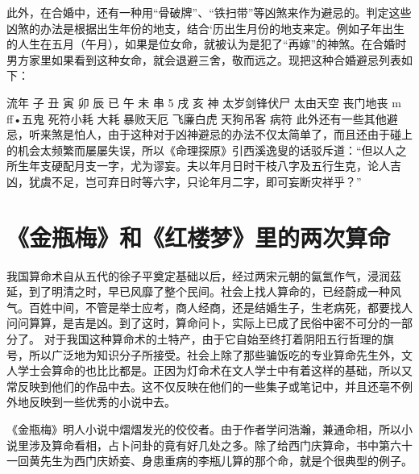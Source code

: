此外，在合婚中，还有一种用“骨破牌”、“铁扫带”等凶煞来作为避忌的。判定这些凶煞的办法是根据出生年份的地支，结合‘历出生月份的地支来定。例如子年出生的人生在五月（午月），如果是位女命，就被认为是犯了“再嫁”的神煞。在合婚时男方家里如果看到这种女命，就会退避三舍，敬而远之。现把这种合婚避忌列表如下：

流年	子	丑	寅	卯	辰	已	午	未	串	5	戌	亥
神	太岁剑锋伏尸	太由天空	丧门地丧	m	ff•五鬼	死符小耗	大耗	暴败天厄	飞廉白虎		天狗吊客	病符
此外还有一些其他避忌，听来煞是怕人，由于这种对于凶神避忌的办法不仅太简单了，而且还由于碰上的机会太频繁而屡屡失误，所以《命理探原》引西溪逸叟的话驳斥道：“但以人之所生年支硬配月支一字，尤为谬妄。夫以年月日时干枝八字及五行生克，论人吉凶，犹虞不足，岂可弃日时等六字，只论年月二字，即可妄断灾祥乎？”

\section{《金瓶梅》和《红楼梦》里的两次算命}
我国算命术自从五代的徐子平奠定基础以后，经过两宋元朝的氤氳作气，浸润茲延，到了明清之时，早已风靡了整个民间。社会上找人算命的，已经蔚成一种风气。百姓中间，不管是举士应考，商人经商，还是结婚生子，生老病死，都要找人问问算算，是吉是凶。到了这时，算命问卜，实际上已成了民俗中密不可分的一部分了。
对于我国这种算命术的土特产，由于它自始至终打着阴阳五行哲理的旗号，所以广泛地为知识分子所接受。社会上除了那些骗饭吃的专业算命先生外，文人学士会算命的也比比都是。正因为灯命术在文人学士中有着这样的基础，所以又常反映到他们的作品中去。这不仅反映在他们的一些集子或笔记中，并且还亳不例外地反映到一些优秀的小说中去。

《金瓶梅》明人小说中熠熠发光的佼佼者。由于作者学问浩瀚，兼通命相，所以小说里涉及算命看相，占卜问卦的竟有好几处之多。除了给西门庆算命，书中第六十一回黄先生为西门庆娇妾、身患重病的李瓶儿算的那个命，就是个很典型的例子。

